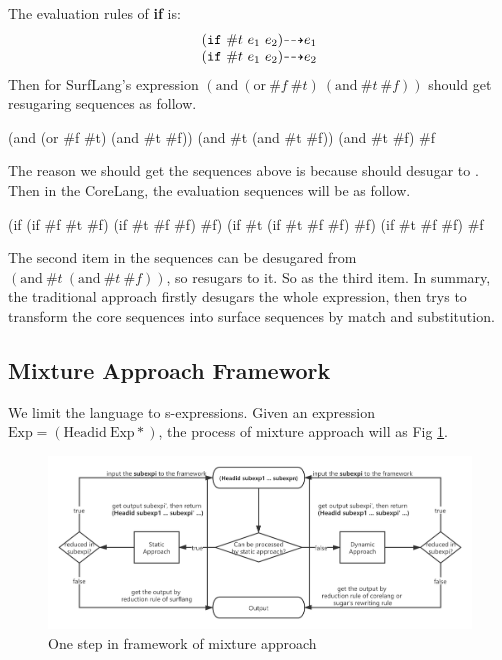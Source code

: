The evaluation rules of {\bfseries if} is:
\[
\begin{array}{l}
(\m{if}~\true~e_1~e_2) \DeStep{e_1}\\
(\m{if}~\true~e_1~e_2) \DeStep{e_2}
\end{array}
\]
Then for SurfLang's expression $(\mbox{and}~(\mbox{or}~\#f~\#t)~(\mbox{and}~\#t~\#f))$ should get resugaring sequences as follow.

\begin{Codes}
    (and (or \#f \#t) (and \#t \#f))
\OneStep (and \#t (and \#t \#f))
\OneStep (and \#t \#f)
\OneStep \#f
\end{Codes}

The reason we should get the sequences above is because  should desugar to . Then in the CoreLang, the evaluation sequences will be as follow.
\begin{Codes}
    (if (if \#f \#t \#f) (if \#t \#f \#f) \#f)
\OneStep (if \#t (if \#t \#f \#f) \#f)
\OneStep (if \#t \#f \#f)
\OneStep \#f
\end{Codes}

The second item in the sequences can be desugared from $(\mbox{and}~\#t~(\mbox{and}~\#t~\#f))$, so resugars to it. So as the third item. In summary, the traditional approach firstly desugars the whole expression, then trys to transform the core sequences into surface sequences by match and substitution.

\subsection{Mixture Approach Framework}
We limit the language to s-expressions. Given an expression $\mbox{Exp} = (\mbox{Headid}~\mbox{Exp}*)$, the process of mixture approach will as Fig \ref{fig:mixture}.

\begin{figure}[t]
	\centering
	\includegraphics[width=12cm]{images/mixture.png}
	\caption{One step in framework of mixture approach}
	\label{fig:mixture}
\end{figure}

